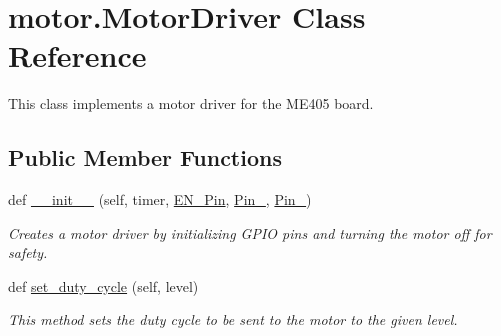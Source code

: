 \hypertarget{classmotor_1_1MotorDriver}{}\section{motor.\+Motor\+Driver Class Reference}
\label{classmotor_1_1MotorDriver}


This class implements a motor driver for the M\+E405 board.  


\subsection*{Public Member Functions}
\begin{DoxyCompactItemize}
\item 
def \hyperlink{classmotor_1_1MotorDriver_a51599bab25f5979308d265a514e99ac0}{\+\_\+\+\_\+init\+\_\+\+\_\+} (self, timer, \hyperlink{classmotor_1_1MotorDriver_a8f89863faa5971f7ecd3f238e7fc6a7a}{E\+N\+\_\+\+Pin}, \hyperlink{classmotor_1_1MotorDriver_aca14e26826187d9f97008c2a4d94e3a7}{Pin\+\_}, \hyperlink{classmotor_1_1MotorDriver_a37941f357ab92aec7a783847c6d60e99}{Pin\+\_})
\begin{DoxyCompactList}\small\item\em Creates a motor driver by initializing G\+P\+IO pins and turning the motor off for safety. \end{DoxyCompactList}\item 
def \hyperlink{classmotor_1_1MotorDriver_a51b4721406aa66e0807413199b8b700f}{set\+\_\+duty\+\_\+cycle} (self, level)
\begin{DoxyCompactList}\small\item\em This method sets the duty cycle to be sent to the motor to the given level. \end{DoxyCompactList}\end{DoxyCompactItemize}
